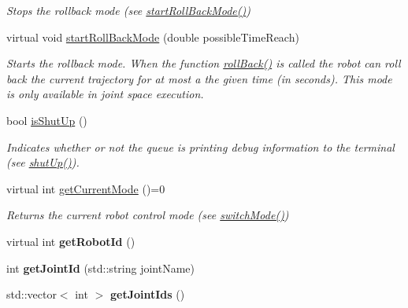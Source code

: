 \begin{DoxyCompactItemize}
\begin{DoxyCompactList}\small\item\em Stops the rollback mode (see \hyperlink{classkukadu_1_1ControlQueue_acb6ba5c61e9c26dcaa8e4073946e3791}{start\+Roll\+Back\+Mode()}) \end{DoxyCompactList}\item 
virtual void \hyperlink{classkukadu_1_1ControlQueue_acb6ba5c61e9c26dcaa8e4073946e3791}{start\+Roll\+Back\+Mode} (double possible\+Time\+Reach)
\begin{DoxyCompactList}\small\item\em Starts the rollback mode. When the function \hyperlink{classkukadu_1_1ControlQueue_a650c486b9f78d3dec1db8741b575a0ab}{roll\+Back()} is called the robot can roll back the current trajectory for at most a the given time (in seconds). This mode is only available in joint space execution. \end{DoxyCompactList}\item 
bool \hyperlink{classkukadu_1_1ControlQueue_af8d1c646ba20dc854675b6af5fcb6701}{is\+Shut\+Up} ()
\begin{DoxyCompactList}\small\item\em Indicates whether or not the queue is printing debug information to the terminal (see \hyperlink{classkukadu_1_1ControlQueue_a8e76e19772053274046193436b0cae1c}{shut\+Up()}). \end{DoxyCompactList}\item 
virtual int \hyperlink{classkukadu_1_1ControlQueue_afce92074c674d8a1b0127190fd0603cf}{get\+Current\+Mode} ()=0
\begin{DoxyCompactList}\small\item\em Returns the current robot control mode (see \hyperlink{classkukadu_1_1ControlQueue_a5defe63d9f1b9829676f9a31a4683911}{switch\+Mode()}) \end{DoxyCompactList}\item 
virtual int {\bfseries get\+Robot\+Id} ()\hypertarget{classkukadu_1_1ControlQueue_ad6dd9fb5cc05f50b2dc4dcf9f646f1bf}{}\label{classkukadu_1_1ControlQueue_ad6dd9fb5cc05f50b2dc4dcf9f646f1bf}

\item 
int {\bfseries get\+Joint\+Id} (std\+::string joint\+Name)\hypertarget{classkukadu_1_1ControlQueue_aff80ecc4803860d32864dad5cc137cf0}{}\label{classkukadu_1_1ControlQueue_aff80ecc4803860d32864dad5cc137cf0}

\item 
std\+::vector$<$ int $>$ {\bfseries get\+Joint\+Ids} ()\hypertarget{classkukadu_1_1ControlQueue_a28d0f8cf6fe5f330eef5900c7c66d45c}{}\label{classkukadu_1_1ControlQueue_a28d0f8cf6fe5f330eef5900c7c66d45c}


\end{DoxyCompactItemize}
